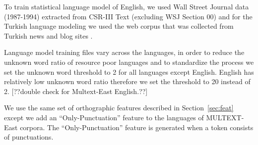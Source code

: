 To train statistical language model of English, we used Wall Street
Journal data (1987-1994) extracted from CSR-III Text \cite{csr3text}
(excluding WSJ Section 00) and for the Turkish language modeling we
used the web corpus that was collected from Turkish news and blog
sites \cite{sak2008turkish}.

Language model training files vary across the languages, in order to
reduce the unknown word ratio of resource poor languages and to
standardize the process we set the unknown word threshold to 2 for all
languages except English.  English has relatively low unknown word
ratio therefore we set the threshold to 20 instead of 2. [??double
  check for Multext-East English.??]

We use the same set of orthographic features described in
Section~\ref{sec:feat} except we add an ``Only-Punctuation'' feature
to the languages of MULTEXT-East corpora.  The ``Only-Punctuation''
feature is generated when a token consists of punctuations.

